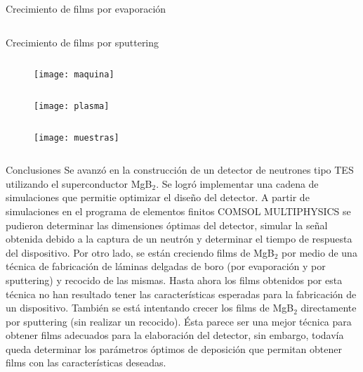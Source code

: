 \documentclass[final]{beamer}
\newlength{\sepwid}
\newlength{\onecolwid}
\begin{document}
\begin{frame}[t]
\begin{columns}[t]
\begin{column}{\onecolwid}
\begin{block}{\normalsize{Crecimiento de films por evaporación}}
\begin{column}{19.5cm}
\end{column}
\end{block}
\vspace{1.9cm}
\begin{block}{\normalsize{Crecimiento de films por sputtering}}
\begin{column}{15cm}
\begin{figure}
 \hspace{-2cm}
 \texttt{[image: maquina]}
\end{figure}
\end{column}
\begin{column}{11cm}
\begin{figure}
\hspace{-4cm}
 \texttt{[image: plasma]}
\end{figure}
\end{column}
\begin{column}{12cm}
\begin{figure}
\vspace*{0.1cm}
\hspace{-2.5cm}
 \texttt{[image: muestras]}
\end{figure}
\end{column}
\end{block}
\vspace{1.4cm}
\begin{alertblock}{\normalsize{Conclusiones}}
Se avanzó en la construcción de un detector de neutrones tipo TES utilizando el superconductor MgB$_2$. Se logró implementar una cadena de simulaciones que permitie optimizar el diseño del detector. A partir de simulaciones en el programa de elementos finitos COMSOL MULTIPHYSICS se pudieron determinar las dimensiones óptimas del detector, simular la señal obtenida debido a la captura de un neutrón y determinar el tiempo de res\-pues\-ta del dispositivo. Por otro lado, se están creciendo films de MgB$_2$ por medio de una técnica de fabricación de láminas delgadas de boro (por evaporación y por sputtering) y recocido de las mismas. Hasta ahora los films obtenidos por esta técnica no han resultado tener las características esperadas para la fabricación de un dispositivo. También se está intentando crecer los films de MgB$_2$ directamente por sputtering (sin realizar un recocido). Ésta parece ser una mejor técnica para ob\-te\-ner films adecuados para la elaboración del detector, sin embargo, todavía queda determinar los parámetros óptimos de deposición que permitan obtener films con las características deseadas.
\end{alertblock}
\end{column}
\end{columns}
\end{frame}
\end{document}
